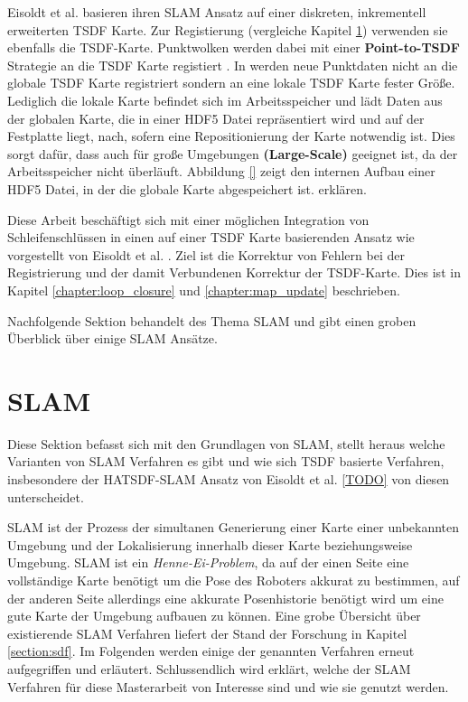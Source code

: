 Eisoldt et al. \cite{HATSDF} basieren ihren SLAM Ansatz auf einer diskreten, inkrementell erweiterten TSDF Karte. Zur Registierung (vergleiche Kapitel \ref{section:slam}) verwenden sie ebenfalls die TSDF-Karte. Punktwolken werden dabei mit einer \textbf{Point-to-TSDF} Strategie an die TSDF Karte registiert \cite{HATSDF}.
In \cite{HATSDF} werden neue Punktdaten nicht an die globale TSDF Karte registriert sondern an eine lokale TSDF Karte fester Größe. Lediglich die lokale Karte befindet sich im Arbeitsspeicher und lädt Daten aus der globalen Karte, die in einer HDF5 Datei repräsentiert wird und auf der Festplatte liegt, nach, sofern eine Repositionierung der Karte notwendig ist.
Dies sorgt dafür, dass \cite{HATSDF} auch für große Umgebungen \textbf{(Large-Scale)} geeignet ist, da der Arbeitsspeicher nicht überläuft.
Abbildung \ref{} zeigt den internen Aufbau einer HDF5 Datei, in der die globale Karte abgespeichert ist.
 erklären.

Diese Arbeit beschäftigt sich mit einer möglichen Integration von Schleifenschlüssen in einen auf einer TSDF Karte basierenden Ansatz wie vorgestellt von Eisoldt et al. \cite{HATSDF}. Ziel ist die Korrektur von Fehlern bei der Registrierung und der damit Verbundenen Korrektur der TSDF-Karte. Dies ist in Kapitel \ref{chapter:loop_closure} und \ref{chapter:map_update} beschrieben.

Nachfolgende Sektion behandelt des Thema SLAM und gibt einen groben Überblick über einige SLAM Ansätze. 


\section{SLAM}
\label{section:slam}

Diese Sektion befasst sich mit den Grundlagen von SLAM, stellt heraus welche Varianten von SLAM Verfahren es gibt und wie sich TSDF basierte Verfahren, insbesondere der HATSDF-SLAM Ansatz von Eisoldt et al. \ref{TODO} von diesen unterscheidet.

SLAM ist der Prozess der simultanen Generierung einer Karte einer unbekannten Umgebung und der Lokalisierung innerhalb dieser Karte beziehungsweise Umgebung.
SLAM ist ein \textit{Henne-Ei-Problem}, da auf der einen Seite eine vollständige Karte benötigt um die Pose des Roboters akkurat zu bestimmen, auf der anderen Seite allerdings eine akkurate Posenhistorie benötigt wird um eine gute Karte der Umgebung aufbauen zu können.
Eine grobe Übersicht über existierende SLAM Verfahren liefert der Stand der Forschung in Kapitel \ref{section:sdf}.
Im Folgenden werden einige der genannten Verfahren erneut aufgegriffen und erläutert.
Schlussendlich wird erklärt, welche der SLAM Verfahren für diese Masterarbeit von Interesse sind und wie sie genutzt werden.

